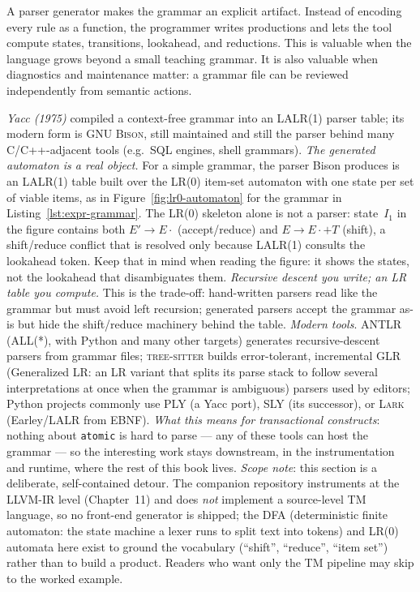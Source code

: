 A parser generator makes the grammar an explicit artifact. Instead of encoding every rule as a function, the programmer writes productions and lets the tool compute states, transitions, lookahead, and reductions. This is valuable when the language grows beyond a small teaching grammar. It is also valuable when diagnostics and maintenance matter: a grammar file can be reviewed independently from semantic actions.

\emph{Yacc (1975)} compiled a context-free grammar into an \textsc{LALR(1)} parser table; its modern form is \textsc{GNU Bison}, still maintained and still the parser behind many C/C++-adjacent tools (e.g.\ SQL engines, shell grammars). \emph{The generated automaton is a real object.} For a simple grammar, the parser Bison produces is an \textsc{LALR(1)} table built over the LR(0) item-set automaton with one state per set of viable items, as in Figure~\ref{fig:lr0-automaton} for the grammar in Listing~\ref{lst:expr-grammar}. The LR(0) skeleton alone is not a parser: state~$I_1$ in the figure contains both $E' \to E\cdot$ (accept/reduce) and $E \to E\cdot+T$ (shift), a shift/reduce conflict that is resolved only because LALR(1) consults the lookahead token. Keep that in mind when reading the figure: it shows the states, not the lookahead that disambiguates them. \emph{Recursive descent you write; an LR table you compute.} This is the trade-off: hand-written parsers read like the grammar but must avoid left recursion; generated parsers accept the grammar as-is but hide the shift/reduce machinery behind the table. \emph{Modern tools}. \textsc{ANTLR} (ALL(*), with Python and many other targets) generates recursive-descent parsers from grammar files; \textsc{tree-sitter} builds error-tolerant, incremental \textsc{GLR} (Generalized LR: an LR variant that splits its parse stack to follow several interpretations at once when the grammar is ambiguous) parsers used by editors; Python projects commonly use \textsc{PLY} (a Yacc port), \textsc{SLY} (its successor), or \textsc{Lark} (Earley/LALR from \textsc{EBNF}). \emph{What this means for transactional constructs}: nothing about \texttt{atomic} is hard to parse --- any of these tools can host the grammar --- so the interesting work stays downstream, in the instrumentation and runtime, where the rest of this book lives. \emph{Scope note}: this section is a deliberate, self-contained detour. The companion repository instruments at the LLVM-IR level (Chapter~11) and does \emph{not} implement a source-level TM language, so no front-end generator is shipped; the DFA (deterministic finite automaton: the state machine a lexer runs to split text into tokens) and LR(0) automata here exist to ground the vocabulary (``shift'', ``reduce'', ``item set'') rather than to build a product. Readers who want only the TM pipeline may skip to the worked example.

